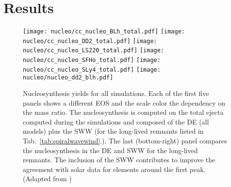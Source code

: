 


\section{Results}


\begin{figure*}[h!]
    \centering 
    \texttt{[image: nucleo/cc\_nucleo\_BLh\_total.pdf]}
    \texttt{[image: nucleo/cc\_nucleo\_DD2\_total.pdf]}
    \texttt{[image: nucleo/cc\_nucleo\_LS220\_total.pdf]}
    \texttt{[image: nucleo/cc\_nucleo\_SFHo\_total.pdf]}
    \texttt{[image: nucleo/cc\_nucleo\_SLy4\_total.pdf]}
    \texttt{[image: nucleo/nucleo\_dd2\_blh.pdf]}
    \caption{Nucleosynthesis yields for all simulations. Each %
        of the first five panels 
        shows a different EOS and the scale color the dependency on the
        mass ratio. The nucleosynthesis is computed on the total ejecta
        computed during the simulations and 
        composed of the \ac{DE} (all models) plus the \ac{SWW} 
        (for the long-lived remnants listed in
        Tab.~\ref{tab:spiralwavewind}.).
        The last (bottom-right) panel compares the nucleosynthesis in
        the \ac{DE} and \ac{SWW} for the long-lived
        remnants. The inclusion of the \ac{SWW} contributes to 
        improve the agreement with solar data for elements around the first peak.
        (Adapted from \citet{Nedora:2020pak})
    }
    \label{fig:nucle:totalyields}
\end{figure*}




